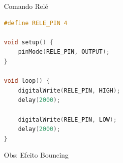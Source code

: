 \begin{frame}[fragile]{Comando Relé}
\begin{lstlisting}[language=C, basicstyle=\tiny\ttfamily]
#define RELE_PIN 4

void setup() {
    pinMode(RELE_PIN, OUTPUT);
}

void loop() {
    digitalWrite(RELE_PIN, HIGH);
    delay(2000);

    digitalWrite(RELE_PIN, LOW);
    delay(2000);
}
\end{lstlisting}

Obs: Efeito Bouncing
\end{frame}
        
        